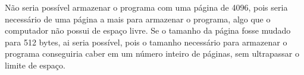 \begin{question}

     Não seria possível armazenar o programa com uma página de 4096, pois seria 
     necessário de uma página a mais para armazenar o programa, algo que o
     computador não possui de espaço livre. Se o tamanho da página fosse mudado
     para 512 bytes, ai seria possível, pois o tamanho necessário para armazenar o 
     programa conseguiria caber em um número inteiro de páginas, sem ultrapassar o limite 
     de espaço.
\end{question}
